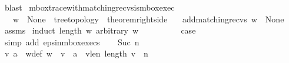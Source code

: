 \begin{isabellebody}
\ blast\isanewline
{}\isamarkupfalse%
%
\endisatagproof
{\isafoldproof}%
%
\isadelimproof
%
\endisadelimproof
%
\isadelimdocument
%
\endisadelimdocument
%
\isatagdocument
%
\isamarkuptrue%
%
\endisatagdocument
{\isafolddocument}%
%
\isadelimdocument
%
\endisadelimdocument
{}\isamarkupfalse%
\ mbox{\isacharunderscore}{\kern0pt}trace{\isacharunderscore}{\kern0pt}with{\isacharunderscore}{\kern0pt}matching{\isacharunderscore}{\kern0pt}recvs{\isacharunderscore}{\kern0pt}is{\isacharunderscore}{\kern0pt}mbox{\isacharunderscore}{\kern0pt}exec{\isacharcolon}{\kern0pt}\isanewline
\ \ \ {\isachardoublequoteopen}w\ {\isasymin}\ {\isasymT}\isactrlbsub None\isactrlesub {\isasymdownharpoonright}\isactrlsub {\isacharbang}{\kern0pt}{\isachardoublequoteclose}\ \ {\isachardoublequoteopen}tree{\isacharunderscore}{\kern0pt}topology{\isachardoublequoteclose}\ \ {\isachardoublequoteopen}theorem{\isacharunderscore}{\kern0pt}rightside{\isachardoublequoteclose}\isanewline
\ \ \ {\isachardoublequoteopen}{\isacharparenleft}{\kern0pt}add{\isacharunderscore}{\kern0pt}matching{\isacharunderscore}{\kern0pt}recvs\ w{\isacharparenright}{\kern0pt}\ {\isasymin}\ {\isasymT}\isactrlbsub None\isactrlesub {\isachardoublequoteclose}\isanewline
%
\isadelimproof
\ \ %
\endisadelimproof
%
\isatagproof
{}\isamarkupfalse%
\ assms\isanewline
{}\isamarkupfalse%
\ {\isacharparenleft}{\kern0pt}induct\ {\isachardoublequoteopen}length\ w{\isachardoublequoteclose}\ arbitrary{\isacharcolon}{\kern0pt}\ w{\isacharparenright}{\kern0pt}\isanewline
\ \ \isamarkupfalse%
\ {}\isanewline
\ \ \isamarkupfalse%
\ \isamarkupfalse%
\ {\isacharquery}{\kern0pt}case\ \isamarkupfalse%
\ {\isacharparenleft}{\kern0pt}simp\ add{\isacharcolon}{\kern0pt}\ eps{\isacharunderscore}{\kern0pt}in{\isacharunderscore}{\kern0pt}mbox{\isacharunderscore}{\kern0pt}execs{\isacharparenright}{\kern0pt}\isanewline
{}\isamarkupfalse%
\isanewline
\ \ \isamarkupfalse%
\ {\isacharparenleft}{\kern0pt}Suc\ n{\isacharparenright}{\kern0pt}\isanewline
\ \ \ \ \isanewline
\ \ \isamarkupfalse%
\ \isamarkupfalse%
\ v\ a\ \ w{\isacharunderscore}{\kern0pt}def{\isacharcolon}{\kern0pt}\ {\isachardoublequoteopen}w\ {\isacharequal}{\kern0pt}\ v\ {\isasymsqdot}\ {\isacharbrackleft}{\kern0pt}a{\isacharbrackright}{\kern0pt}{\isachardoublequoteclose}\ \ v{\isacharunderscore}{\kern0pt}len{\isacharcolon}{\kern0pt}\ {\isachardoublequoteopen}length\ v\ {\isacharequal}{\kern0pt}\ n{\isachardoublequoteclose}\ \isamarkupfalse%

\end{isabellebody}

